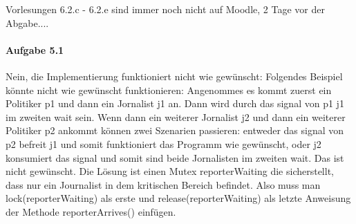 \documentclass[11pt]{article}
\begin{document}

Vorlesungen 6.2.c - 6.2.e sind immer noch nicht auf Moodle, 2 Tage vor der Abgabe....

\paragraph{Aufgabe 5.1}
Nein, die Implementierung funktioniert nicht wie gewünscht:
Folgendes Beispiel könnte nicht wie gewünscht funktionieren: Angenommes es kommt zuerst ein Politiker p1 und dann ein Jornalist j1 an. Dann wird durch das signal von p1 j1 im zweiten wait sein. Wenn dann ein weiterer Jornalist j2 und dann ein weiterer Politiker p2 ankommt können zwei Szenarien passieren: entweder das signal von p2 befreit j1 und somit funktioniert das Programm wie gewünscht, oder j2 konsumiert das signal und somit sind beide Jornalisten im zweiten wait. Das ist nicht gewünscht.
Die Lösung ist einen Mutex reporterWaiting die sicherstellt, dass nur ein Journalist in dem kritischen Bereich befindet. Also muss man lock(reporterWaiting) als erste und release(reporterWaiting) als letzte Anweisung der Methode reporterArrives() einfügen.
\end{document}
